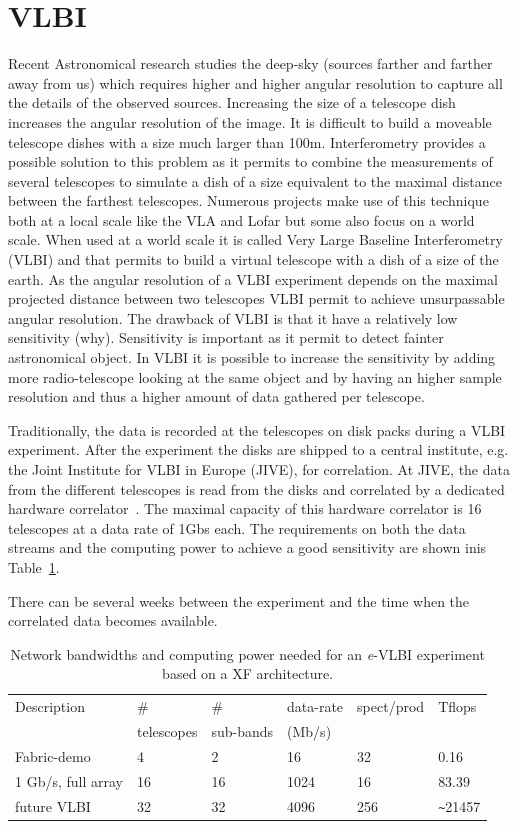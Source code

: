 \section{VLBI}\label{sec:vlbi}
Recent Astronomical research studies the deep-sky (sources farther and
farther away from us) which requires higher and higher angular
resolution to capture all the details of the observed sources.
Increasing the size of a telescope dish increases the angular
resolution of the image. It is difficult to build a moveable 
telescope dishes with a size much larger than 100m. Interferometry 
provides a possible solution to this problem as it permits to combine the measurements of several telescopes to simulate a dish of a size equivalent to the maximal
distance between the farthest telescopes. Numerous projects make 
use of this technique both at a local scale like the VLA and Lofar 
but some also focus on a world scale. When used at a world scale it is  called   
Very Large Baseline Interferometry (VLBI) and that permits to build 
a virtual telescope with a dish of a size of the earth.
As the angular resolution of a VLBI experiment depends on the maximal 
projected distance between two telescopes VLBI permit to achieve 
unsurpassable angular resolution. The drawback of VLBI is that it have 
a relatively low sensitivity (why). Sensitivity is important as it 
permit to detect fainter astronomical object. In VLBI it is possible 
to increase the sensitivity by adding more radio-telescope looking 
at the same object and by having an higher sample resolution and thus 
a higher amount of data gathered per telescope. 

Traditionally, the data is recorded at the telescopes on
disk packs during a VLBI experiment. After the experiment the disks
are shipped to a central institute, e.g. the Joint Institute for VLBI
in Europe (JIVE), for correlation. At JIVE, the data from the
different telescopes is read from the disks and correlated by a
dedicated hardware correlator~\cite{EVNCorrelator}. The maximal
capacity of this hardware correlator is 16 telescopes at a data rate
of 1Gbs each. The requirements on both the data streams and
the computing power to achieve a good sensitivity are shown inis
Table~\ref{tab:speed}.

There can be several weeks between the experiment and
the time when the correlated data becomes available.

\begin{table}
  \centering
  \begin{tabular}[c]{|l|l|l|l|l|l|}
    \hline
    Description & \# & \#  & data-rate & spect/prod & Tflops\\
    & telescopes & sub-bands & (Mb/s) &  & \\
    \hline
    \hline
    Fabric-demo &4 &2 &16 &32 &0.16\\
    1 Gb/s, full array  &16 &16 &1024 &16 &83.39\\
    future VLBI &32 &32 &4096 &256 &\verb|~|21457\\
    \hline
  \end{tabular}
  \caption{Network bandwidths and computing power needed for an {\it e}-VLBI
    experiment based on a XF architecture.}
  \label{tab:speed}
\end{table}
